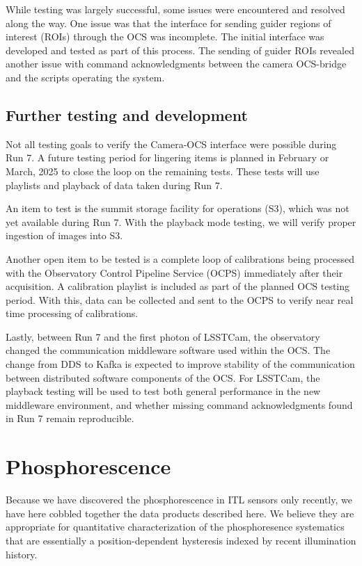 While testing was largely successful, some issues were encountered and resolved along the way. One issue was that the interface for sending guider regions of interest (ROIs) through the OCS was incomplete. The initial interface was developed and tested as part of this process. The sending of guider ROIs revealed another issue with command acknowledgments between the camera OCS-bridge and the scripts operating the system.  


\subsection{Further testing and development}
Not all testing goals to verify the Camera-OCS interface were possible during Run 7. A future testing period for lingering items is planned in February or March, 2025 to close the loop on the remaining tests. These tests will use playlists and playback of data taken during Run 7.

An item to test is the summit storage facility for operations (S3), which was not yet available during Run 7. With the playback mode testing, we will verify proper ingestion of images into S3.

Another open item to be tested is a complete loop of calibrations being processed with the Observatory Control Pipeline Service (OCPS) immediately after their acquisition. A calibration playlist is included as part of the planned OCS testing period. With this, data can be collected and sent to the OCPS to verify near real time processing of calibrations.

Lastly, between Run 7 and the first photon of LSSTCam, the observatory changed the communication middleware software used within the OCS. The change from DDS to Kafka is expected to improve stability of the communication between distributed software components of the OCS. For LSSTCam, the playback testing will be used to test both general performance in the new middleware environment, and whether missing command acknowledgments found in Run 7 remain reproducible. 

\clearpage
\section{Phosphorescence}\label{appendix:phosphorescence}
Because we have discovered the phosphorescence in ITL sensors only recently, we have here cobbled together the data products described here. We believe they are appropriate for quantitative characterization of the phosphoresence systematics that are essentially a position-dependent hysteresis indexed by recent illumination history. 

